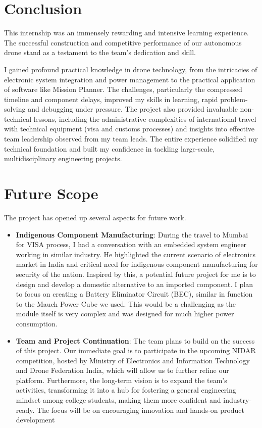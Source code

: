 
\chapter{Conclusion}

This internship was an immensely rewarding and intensive learning experience. The successful construction and competitive performance of our autonomous drone stand as a testament to the team's dedication and skill.

I gained profound practical knowledge in drone technology, from the intricacies of electronic system integration and power management to the practical application of software like Mission Planner. The challenges, particularly the compressed timeline and component delays, improved my skills in learning, rapid problem-solving and debugging under pressure. The project also provided invaluable non-technical lessons, including the administrative complexities of international travel with technical equipment (visa and customs processes) and insights into effective team leadership observed from my team leads. The entire experience solidified my technical foundation and built my confidence in tackling large-scale, multidisciplinary engineering projects.

\pagebreak
\chapter{Future Scope}

The project has opened up several aspects for future work.

\begin{itemize}
	\item \textbf{Indigenous Component Manufacturing}:
During the travel to Mumbai for VISA process, I had a conversation with an embedded system engineer working in similar industry. He highlighted the current scenario of electronics market in India and critical need for indigenous component manufacturing for security of the nation. Inspired by this, a potential future project for me is to design and develop a domestic alternative to an imported component. I plan to focus on creating a Battery Eliminator Circuit (BEC), similar in function to the Mauch Power Cube we used. This would be a challenging as the module itself is very complex and was designed for much higher power consumption.

\item \textbf{Team and Project Continuation}:
The team plans to build on the success of this project. Our immediate goal is to participate in the upcoming NIDAR competition, hosted by Ministry of Electronics and Information Technology and Drone Federation India, which will allow us to further refine our platform. Furthermore, the long-term vision is to expand the team's activities, transforming it into a hub for fostering a general engineering mindset among college students, making them more confident and industry-ready. The focus will be on encouraging innovation and hands-on product development
\end{itemize}
